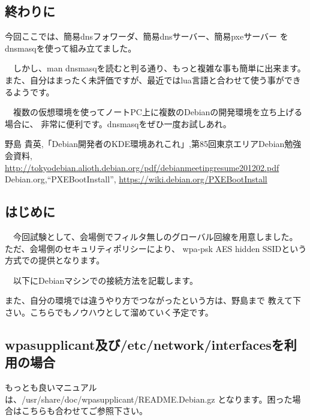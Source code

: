 \documentclass[mingoth,a4paper]{jsarticle}
\begin{document}
\subsection{終わりに}

 今回ここでは、簡易dnsフォワーダ、簡易dnsサーバー、簡易pxeサーバー
をdnsmasqを使って組み立てました。

　しかし、man dnsmasqを読むと判る通り、もっと複雑な事も簡単に出来ます。
また、自分はまったく未評価ですが、最近ではlua言語と合わせて使う事ができるようです。

　複数の仮想環境を使ってノートPC上に複数のDebianの開発環境を立ち上げる場合に、
非常に便利です。dnsmasqをぜひ一度お試しあれ。

\begin{thebibliography}{0}
    {\footnotesize{
       野島 貴英,「Debian開発者のKDE環境あれこれ」,第85回東京エリアDebian勉強会資料,
       \url{http://tokyodebian.alioth.debian.org/pdf/debianmeetingresume201202.pdf}
       }}
    {\footnotesize{
       Debian.org,``PXEBootInstall'',
       \url{https://wiki.debian.org/PXEBootInstall}
       }}
\end{thebibliography}


 \subsection{はじめに}

　今回試験として、会場側でフィルタ無しのグローバル回線を用意しました。
ただ、会場側のセキュリティポリシーにより、
wpa-psk AES hidden SSIDという方式での提供となります。

　以下にDebianマシンでの接続方法を記載します。

 また、自分の環境では違うやり方でつながったという方は、野島まで
教えて下さい。こちらでもノウハウとして溜めていく予定です。

 \subsection{wpasupplicant及び/etc/network/interfacesを利用の場合}

 もっとも良いマニュアルは、/usr/share/doc/wpasupplicant/README.Debian.gz
となります。困った場合はこちらも合わせてご参照下さい。
\end{document}
